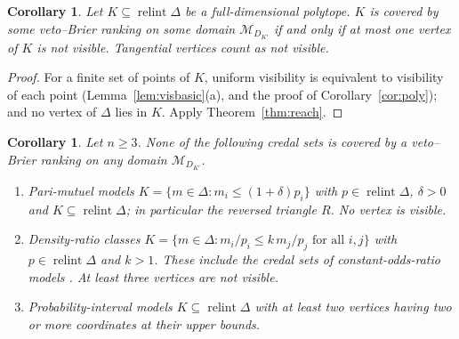 \documentclass[11pt]{article}
\newcommand{\M}{\mathcal{M}}
\DeclareMathOperator{\relint}{relint}
\theoremstyle{plain}
\newtheorem{corollary}[theorem]{Corollary}
\theoremstyle{definition}
\theoremstyle{remark}
\begin{document}
\begin{corollary}\label{cor:polyreach}
Let $K\subseteq\relint\Delta$ be a full-dimensional polytope. $K$ is covered by some
veto--Brier ranking on some domain $\M_{D_{K'}}$ if and only if at most one vertex of $K$
is not visible. Tangential vertices count as not visible.
\end{corollary}

\begin{proof}
For a finite set of points of $K$, uniform visibility is equivalent to visibility of each
point (Lemma~\ref{lem:visbasic}(a), and the proof of Corollary~\ref{cor:poly}); and no
vertex of $\Delta$ lies in $K$. Apply Theorem~\ref{thm:reach}.
\end{proof}

\begin{corollary}\label{cor:out}
Let $n\ge3$. None of the following credal sets is covered by a veto--Brier ranking on any
domain $\M_{D_{K'}}$.
\begin{enumerate}[label=(\alph*)]
  \item \emph{Pari-mutuel models} $K=\{m\in\Delta:m_i\le(1+\delta)p_i\}$ with
  $p\in\relint\Delta$, $\delta>0$ and $K\subseteq\relint\Delta$; in particular the reversed
  triangle $R$. No vertex is visible.
  \item \emph{Density-ratio classes} $K=\{m\in\Delta:m_i/p_i\le k\,m_j/p_j\text{ for all
  }i,j\}$ with $p\in\relint\Delta$ and $k>1$. These include the credal sets of
  constant-odds-ratio models \cite{Walley}. At least three vertices are not visible.
  \item Probability-interval models $K\subseteq\relint\Delta$ with at least two vertices
  having two or more coordinates at their upper bounds.
\end{enumerate}
\end{corollary}
\end{document}
